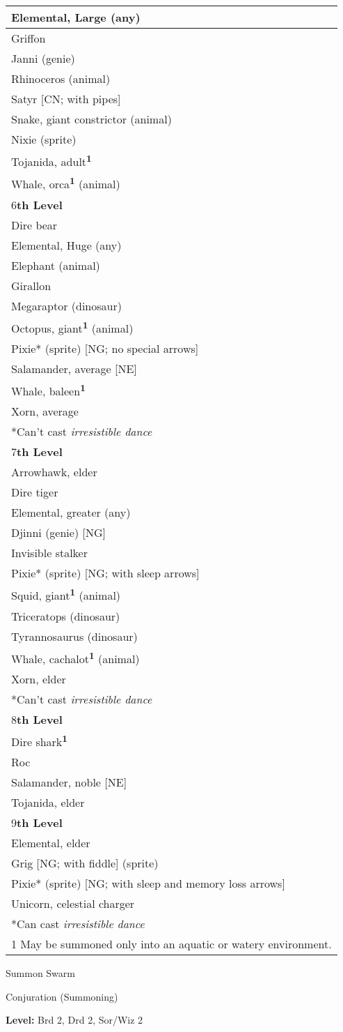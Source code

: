 \documentclass{article}
\begin{document}
\begin{tabular}{|>{\raggedright}p{260pt}|}
\hline
Elemental, Large (any)\tabularnewline
\hline
Griffon\tabularnewline
\hline
Janni (genie)\tabularnewline
\hline
Rhinoceros (animal)\tabularnewline
\hline
Satyr [CN; with pipes]\tabularnewline
\hline
Snake, giant constrictor (animal)\tabularnewline
\hline
Nixie (sprite)\tabularnewline
\hline
Tojanida, adult\textsuperscript{\textbf{1}}\tabularnewline
\hline
Whale, orca\textsuperscript{\textbf{1}}\textbf{ }(animal)\tabularnewline
\hline
6\textbf{th Level}\tabularnewline
\hline
Dire bear\tabularnewline
\hline
Elemental, Huge (any)\tabularnewline
\hline
Elephant (animal)\tabularnewline
\hline
Girallon\tabularnewline
\hline
Megaraptor (dinosaur)\tabularnewline
\hline
Octopus, giant\textsuperscript{\textbf{1}}\textbf{ }(animal)\tabularnewline
\hline
Pixie* (sprite) [NG; no special arrows]\tabularnewline
\hline
Salamander, average [NE]\tabularnewline
\hline
Whale, baleen\textsuperscript{\textbf{1}}\tabularnewline
\hline
Xorn, average\tabularnewline
\hline
*Can't cast \textit{irresistible dance}\tabularnewline
\hline
7\textbf{th Level}\tabularnewline
\hline
Arrowhawk, elder\tabularnewline
\hline
Dire tiger\tabularnewline
\hline
Elemental, greater (any)\tabularnewline
\hline
Djinni (genie) [NG]\tabularnewline
\hline
Invisible stalker\tabularnewline
\hline
Pixie* (sprite) [NG; with sleep arrows]\tabularnewline
\hline
Squid, giant\textsuperscript{\textbf{1}}\textbf{ }(animal)\tabularnewline
\hline
Triceratops (dinosaur)\tabularnewline
\hline
Tyrannosaurus (dinosaur)\tabularnewline
\hline
Whale, cachalot\textsuperscript{\textbf{1}}\textbf{ }(animal)\tabularnewline
\hline
Xorn, elder\tabularnewline
\hline
*Can't cast \textit{irresistible dance}\tabularnewline
\hline
8\textbf{th Level}\tabularnewline
\hline
Dire shark\textsuperscript{\textbf{1}}\tabularnewline
\hline
Roc\tabularnewline
\hline
Salamander, noble [NE]\tabularnewline
\hline
Tojanida, elder\tabularnewline
\hline
9\textbf{th Level}\tabularnewline
\hline
Elemental, elder\tabularnewline
\hline
Grig [NG; with fiddle] (sprite)\tabularnewline
\hline
Pixie* (sprite) [NG; with sleep and memory loss arrows]\tabularnewline
\hline
Unicorn, celestial charger\tabularnewline
\hline
*Can cast \textit{irresistible dance}\tabularnewline
\hline
1 May be summoned only into an aquatic or watery environment.\tabularnewline
\hline
\end{tabular}

\vspace{12pt}
Summon Swarm

Conjuration (Summoning)

\textbf{Level:} Brd 2, Drd 2, Sor/Wiz 2
\end{document}
